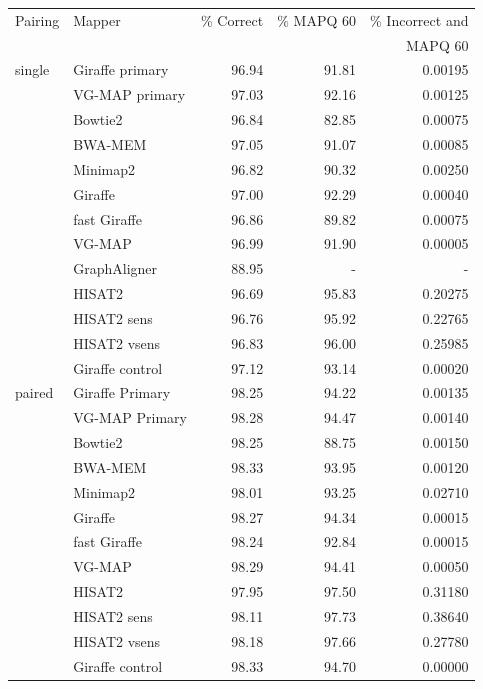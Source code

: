 \documentclass[11pt]{ucscthesis}
\begin{document}
\begin{table}[H]
    \centering
    \begin{tabular}{|l|l|r|r|r|}
    \hline
        Pairing & Mapper & \% Correct & \% MAPQ 60 & \% Incorrect and  \\
              &         &            &            & MAPQ 60           \\
        \hline
        single  & Giraffe primary	    & 96.94     & 91.81     & 0.00195 \\
                & VG-MAP primary        & 97.03     & 92.16     & 0.00125 \\
                & Bowtie2	            & 96.84     & 82.85     & 0.00075 \\
                & BWA-MEM	            & 97.05     & 91.07     & 0.00085 \\
                & Minimap2	            & 96.82     & 90.32     & 0.00250 \\
                & Giraffe	            & 97.00     & 92.29     & 0.00040 \\
                & fast Giraffe	        & 96.86     & 89.82     & 0.00075 \\
                & VG-MAP               	& 96.99     & 91.90     & 0.00005 \\
                & GraphAligner	        & 88.95     & -         & - \\
                & HISAT2	            & 96.69     & 95.83     & 0.20275 \\
                & HISAT2 sens       	& 96.76     & 95.92     & 0.22765 \\
                & HISAT2 vsens	        & 96.83     & 96.00     & 0.25985 \\
                & Giraffe control	    & 97.12     & 93.14     & 0.00020 \\

        \hline
        paired  & Giraffe Primary	& 98.25     & 94.22     & 0.00135 \\
                & VG-MAP Primary	& 98.28     & 94.47     & 0.00140 \\
                & Bowtie2       	& 98.25     & 88.75     & 0.00150 \\
                & BWA-MEM	        & 98.33     & 93.95     & 0.00120 \\
                & Minimap2      	& 98.01     & 93.25     & 0.02710 \\
                & Giraffe	        & 98.27     & 94.34     & 0.00015 \\
                & fast Giraffe  	& 98.24     & 92.84     & 0.00015 \\
                & VG-MAP           	& 98.29     & 94.41     & 0.00050 \\
                & HISAT2        	& 97.95     & 97.50     & 0.31180 \\
                & HISAT2 sens   	& 98.11     & 97.73     & 0.38640 \\
                & HISAT2 vsens	    & 98.18     & 97.66     & 0.27780 \\
                & Giraffe control	& 98.33     & 94.70     & 0.00000 \\
 

\end{tabular}
\end{table}
\end{document}
